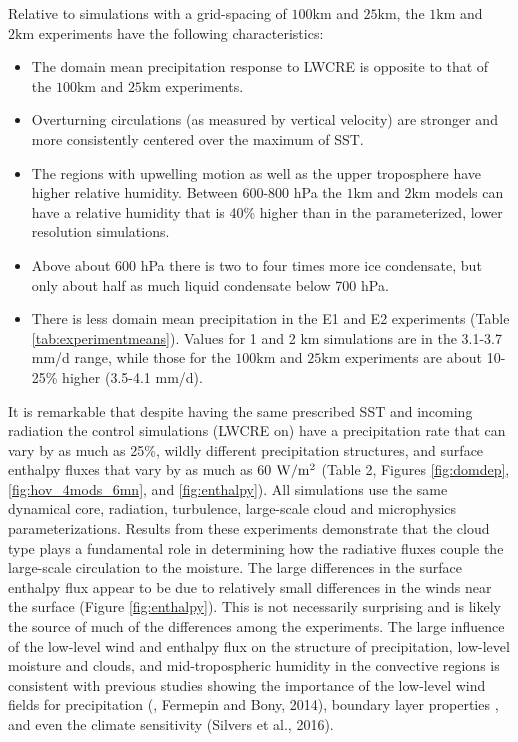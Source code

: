 \documentclass[draft]{agujournal2019}
\begin{document}
{Relative to simulations with a grid-spacing of $100 \textrm{km}$ and $25 \textrm{km}$, the $1 \textrm{km}$ and 
$2 \textrm{km}$ experiments have the following characteristics: 
\begin{itemize}
  \item The domain mean precipitation response to LWCRE is opposite to that of the $100 \textrm{km}$ 
  and $25 \textrm{km}$ experiments.
  \item Overturning circulations (as measured by vertical velocity) are stronger and more consistently centered 
  over the maximum of SST.  
  \item The regions with upwelling motion as well as the upper troposphere have higher relative humidity.   
  Between 600-800 hPa the $1 \textrm{km}$ and $2 \textrm{km}$ models can have a relative humidity 
  that is 40\% higher than in the parameterized, lower resolution simulations.  
  \item Above about 600 hPa there is two to four times more ice condensate, but only about half as much liquid condensate below 700 hPa.
  \item There is less domain mean precipitation in the E1 and E2 experiments (Table \ref{tab:experimentmeans}).  Values for 1 and 2 km simulations are in the 3.1-3.7 mm/d range, while those 
  for the $100 \textrm{km}$ and $25 \textrm{km}$ experiments are about 10-25\% higher (3.5-4.1 mm/d).  
\end{itemize}

It is remarkable that despite having the same prescribed SST and incoming radiation
the control simulations (LWCRE on) have a precipitation rate  that can vary by as much as 
25\%, wildly different precipitation structures, and surface enthalpy fluxes that vary by as much as 
60 $\rm{W/m^2}$ (Table 2, Figures \ref{fig:domdep}, \ref{fig:hov_4mods_6mn}, and \ref{fig:enthalpy}).
All simulations use the same dynamical core, radiation, turbulence, large-scale cloud and microphysics parameterizations.  
Results from these experiments demonstrate that the cloud type
plays a fundamental role in determining how the radiative fluxes couple
the large-scale circulation to the moisture.  The large differences in the surface enthalpy flux
appear to be due to relatively small differences in the winds near the surface (Figure \ref{fig:enthalpy}).  This is not necessarily
surprising and is likely the source of much of the differences among the experiments.  The 
large influence of the low-level wind  and enthalpy flux on the structure of precipitation, 
low-level moisture and clouds, and mid-tropospheric humidity in the convective regions is 
consistent with previous studies showing the importance of the low-level wind fields for precipitation 
(\cite{Wofsy_Kuang_2012}, Fermepin and Bony, 2014), boundary layer properties \cite{Raymond_1994}, and even the climate 
sensitivity (Silvers et al., 2016).  

}
\end{document}

